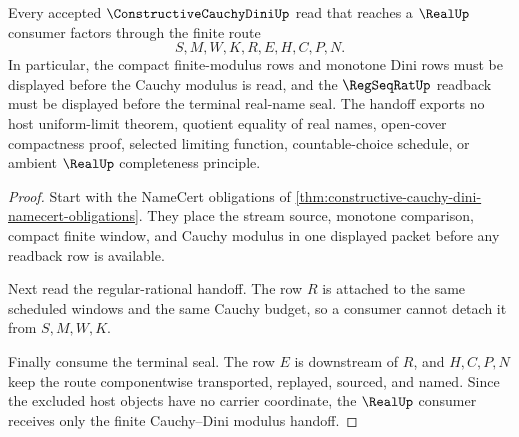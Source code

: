 \begin{theorem}
\label{thm:constructive-cauchy-dini-finite-modulus-handoff}
Every accepted $\ConstructiveCauchyDiniUp$ read that reaches a $\RealUp$ consumer factors through the finite route
$$
S,M,W,K,R,E,H,C,P,N .
$$
In particular, the compact finite-modulus rows and monotone Dini rows must be displayed before the Cauchy modulus is read, and the $\RegSeqRatUp$ readback must be displayed before the terminal real-name seal. The handoff exports no host uniform-limit theorem, quotient equality of real names, open-cover compactness proof, selected limiting function, countable-choice schedule, or ambient $\RealUp$ completeness principle.
\end{theorem}
\begin{proof}
Start with the NameCert obligations of \autoref{thm:constructive-cauchy-dini-namecert-obligations}. They place the stream source, monotone comparison, compact finite window, and Cauchy modulus in one displayed packet before any readback row is available.

Next read the regular-rational handoff. The row $R$ is attached to the same scheduled windows and the same Cauchy budget, so a consumer cannot detach it from $S,M,W,K$.

Finally consume the terminal seal. The row $E$ is downstream of $R$, and $H,C,P,N$ keep the route componentwise transported, replayed, sourced, and named. Since the excluded host objects have no carrier coordinate, the $\RealUp$ consumer receives only the finite Cauchy--Dini modulus handoff.
\end{proof}




